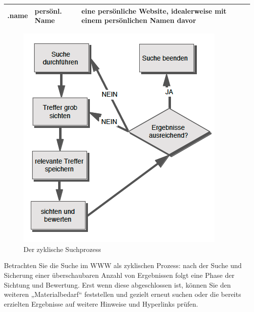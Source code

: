 \documentclass[]{book}
\theoremstyle{definition}
\theoremstyle{definition}
\theoremstyle{definition}
\theoremstyle{remark}
\begin{document}
\begin{longtable}[]{@{}lll@{}}
\begin{minipage}[t]{0.23\columnwidth}\raggedright\strut
.name \vspace{5mm}\strut
\end{minipage} & \begin{minipage}[t]{0.13\columnwidth}\raggedright\strut
persönl. Name \vspace{5mm}\strut
\end{minipage} & \begin{minipage}[t]{0.56\columnwidth}\raggedright\strut
eine persönliche Website, idealerweise mit einem persönlichen Namen
davor \vspace{5mm}\strut
\end{minipage}\tabularnewline
\bottomrule
\end{longtable}

\begin{figure}

{\centering \includegraphics{images/recherchieren-internet-zyklischer-suchprozess-min} 

}

\caption{Der zyklische Suchprozess}\label{fig:unnamed-chunk-13}
\end{figure}

Betrachten Sie die Suche im WWW als zyklischen Prozess: nach der Suche
und Sicherung einer überschaubaren Anzahl von Ergebnissen folgt eine
Phase der Sichtung und Bewertung. Erst wenn diese abgeschlossen ist,
können Sie den weiteren „Materialbedarf`` feststellen und gezielt erneut
suchen oder die bereits erzielten Ergebnisse auf weitere Hinweise und
Hyperlinks prüfen.
\end{document}
